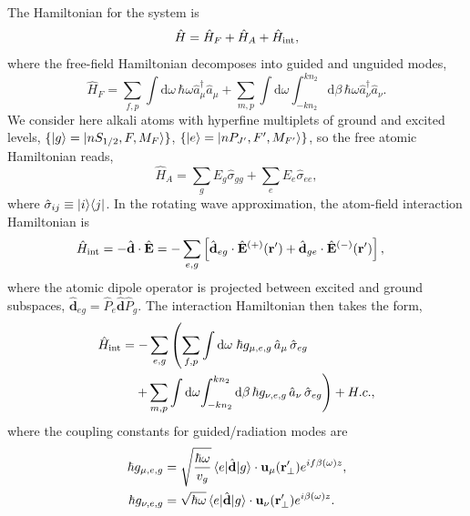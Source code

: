 \documentclass[aps,pra,twocolumn]{revtex4-1} %
\newcommand{\inter}{{\rm int}}
\begin{document}
The Hamiltonian for the system is
\begin{equation}
\hat{H} = \hat{H}_F+\hat{H}_A + \hat{H}_{\inter},
\end{equation}
where the free-field Hamiltonian decomposes into guided and unguided modes, 
	\begin{equation}
		\hat{H}_F = \sum_{f,p}\int \mathrm{d}\omega \, \hbar \omega \hat{a}^\dagger_\mu \hat{a}_\mu 
+\sum_{m,p} \int \mathrm{d}\omega  \int_{-k n_2}^{k n_2} \mathrm{d}\beta \, \hbar \omega 
\hat{a}^\dagger_\nu \hat{a}_\nu.
	\end{equation}
We consider here alkali atoms with hyperfine multiplets of ground and excited levels, $\{ \lvert{g}\rangle=\lvert{nS_{1/2}, F, M_F}\rangle\}$, $\{ \lvert{e}\rangle =\lvert{nP_{J'}, F', M_{F'}}\rangle\}$, so the free atomic Hamiltonian reads,
	\begin{equation}
		\hat{H}_A  = \sum_g E_g \hat{\sigma}_{gg} + \sum_e E_e \hat{\sigma}_{ee},
	\end{equation}
where $\hat{\sigma}_{ij} \equiv \lvert{i}\rangle\langle{j}\rvert$.  In the rotating wave approximation, the atom-field interaction Hamiltonian is
	\begin{align}
		\hat{H}_{\inter} &= -\hat{\mathbf{d}}\cdot \hat{\mathbf{E}} =- \sum_{e,g} \left[ \hat{\mathbf{d}}_{eg}\cdot 
\hat{\mathbf{E}}^{(+)}(\br')+\hat{\mathbf{d}}_{ge}\cdot \hat{\mathbf{E}}^{(-)}(\br') \right],
	\end{align}
where the atomic dipole operator is projected between excited and ground subspaces, $\hat{\mathbf{d}}_{eg}= \hat{P}_e \hat{\mathbf{d}} \hat{P}_g $. The interaction Hamiltonian then takes the form, 
\begin{align}
	\hat{H}_{\inter} &= -\sum_{e,g} \left(\sum_{f,p} \int\mathrm{d}\omega \; \hbar g_{\mu, e,g}\, \hat{a}_\mu  \, 
		\hat{\sigma}_{eg}\right.\nonumber\\
	&\quad \left. + \sum_{m,p} \int\mathrm{d}\omega \! \int_{-kn_2}^{kn_2}\mathrm{d}\beta \,  \hbar 
g_{\nu, e,g}\, \hat{a}_\nu \, \hat{\sigma}_{eg}\right) + {H.c.},
	\end{align}
where the coupling constants for guided/radiation modes are
\begin{subequations} \label{Eq::CouplingConstants}
	\begin{align}
		\hbar g_{\mu, e,g} &= \sqrt{\frac{\hbar \omega}{ v_g  }}\, \langle{e}\rvert \hat{\mathbf{d}} \lvert{g}\rangle 
\cdot\mathbf{u}_\mu ( \mathbf{r}'_\perp ) e^{i f \beta(\omega)z} , \\
		\hbar g_{\nu, e,g} &= \sqrt{  \hbar \omega } \, \langle{e}\rvert \hat{\mathbf{d}} \lvert{g}\rangle \cdot \mathbf{u}_\nu ( \mathbf{r}'_\perp) e^{i\beta(\omega)z}  .
	\end{align}
\end{subequations}
\end{document}
